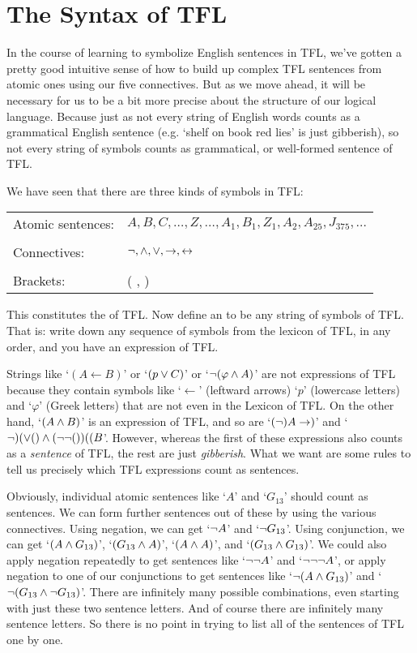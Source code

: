 \section{The Syntax of TFL}\label{s:TFLSyntax}

In the course of learning to symbolize English sentences in TFL, we've gotten a pretty good intuitive sense of how to build up complex TFL sentences from atomic ones using our five connectives.  But as we move ahead, it will be necessary for us to be a bit more precise about the structure of our logical language.  Because just as not every string of English words counts as a grammatical English sentence (e.g. `shelf on book red lies' is just gibberish), so not every string of symbols counts as grammatical, or well-formed sentence of TFL.

We have seen that there are three kinds of symbols in TFL:
\begin{center}
\begin{tabular}{l l}
Atomic sentences: & $A,B,C,\ldots,Z, \ldots, A_1, B_1,Z_1,A_2,A_{25},J_{375},\ldots$\\
\\
Connectives: & $\neg,\wedge,\vee,\rightarrow,\leftrightarrow$\\
\\
Brackets: &( , )\\
\end{tabular}
\end{center}

This constitutes the  of TFL.  Now define an  to be any string of symbols of TFL.  That is: write down any sequence of symbols from the lexicon of TFL, in any order, and you have an expression of TFL.

Strings like `$(A \leftarrow B)$' or `$(p \vee C)$' or `$\neg (\varphi \wedge A)$' are not expressions of TFL because they contain symbols like `$\leftarrow$' (leftward arrows) `$p$' (lowercase letters) and `$\varphi$' (Greek letters) that are not even in the Lexicon of TFL.  On the other hand, `$(A \wedge B)$' is an expression of TFL, and so are `$(\neg)A\rightarrow)$' and `$\lnot)(\vee()\wedge(\neg\neg())((B$'. However, whereas the first of these expressions also counts as a \emph{sentence} of TFL, the rest are just \emph{gibberish}. What we want are some rules to tell us precisely which TFL expressions count as sentences.


Obviously, individual atomic sentences like `$A$' and `$G_{13}$' should count as sentences. We can form further sentences out of these by using the various connectives. Using negation, we can get `$\neg A$' and `$\neg G_{13}$'. Using conjunction, we can get `$(A \wedge G_{13})$', `$(G_{13} \wedge A)$', `$(A \wedge A)$', and `$(G_{13} \wedge G_{13})$'. We could also apply negation repeatedly to get sentences like `$\neg \neg A$' and `$\neg \neg \neg A$', or apply negation to one of our conjunctions to get sentences like `$\neg(A \wedge G_{13})$' and `$\neg(G_{13} \wedge \neg G_{13})$'. There are infinitely many possible combinations, even starting with just these two sentence letters.  And of course there are infinitely many sentence letters. So there is no point in trying to list all of the sentences of TFL one by one.

